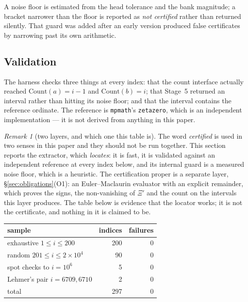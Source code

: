 \documentclass[11pt]{article}
\theoremstyle{plain}
\theoremstyle{definition}
\theoremstyle{remark}
\newtheorem{remark}[theorem]{Remark}
\newcommand{\lean}[1]{\texttt{\detokenize{#1}}}
\begin{document}
\noindent A noise floor is estimated from the head tolerance and the bank magnitude; a
bracket narrower than the floor is reported as \emph{not certified} rather than
returned silently. That guard was added after an early version produced false
certificates by narrowing past its own arithmetic.

\subsection{Validation}\label{sec:validation}
The harness checks three things at every index: that the count interface actually
reached $\mathrm{Count}(a)=i-1$ and $\mathrm{Count}(b)=i$; that Stage~5 returned an
interval rather than hitting its noise floor; and that the interval contains the
reference ordinate. The reference is \texttt{mpmath}'s
\texttt{zetazero}, which is an independent implementation --- it is not derived from
anything in this paper.

\begin{remark}[two layers, and which one this table is]\label{rem:twolayers}
The word \emph{certified} is used in two senses in this paper and they should not be run
together. This section reports the \lean{float64} extractor, which \emph{locates}: it is
fast, it is validated against an independent reference at every index below, and its
internal guard is a measured noise floor, which is a heuristic. The certification proper
is a separate layer, \S\ref{sec:obligations}(O1): an Euler--Maclaurin evaluator with an
explicit remainder, which proves the signs, the non-vanishing of $\Xi'$ and the count on
the intervals this layer produces. The table below is evidence that the locator works;
it is not the certificate, and nothing in it is claimed to be.
\end{remark}

\begin{center}
\begin{tabular}{lrr}
\toprule
sample & indices & failures\\
\midrule
exhaustive $1\le i\le200$ & 200 & 0\\
random $201\le i\le 2\times10^{4}$ & 90 & 0\\
spot checks to $i=10^{6}$ & 5 & 0\\
Lehmer's pair $i=6709,6710$ & 2 & 0\\
\midrule
total & 297 & 0\\
\bottomrule
\end{tabular}
\end{center}
\end{document}
